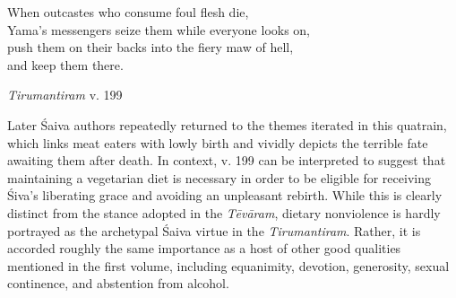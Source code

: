 \begin{pullquote}


	
	    When outcastes who consume foul flesh die,\\
	    Yama's messengers seize them while everyone looks on,\\
	    push them on their backs into the fiery maw of hell,\\
	    and keep them there.\footnotemark{}
	  \\


\medskip\hfill\begin{minipage}{0.9\textwidth}\small\hfill
\emph{{Tirumantiram}} v. 199\end{minipage}\hspace{2em}
\end{pullquote}

Later Śaiva authors repeatedly returned to the themes iterated in this quatrain, which links meat eaters with lowly birth and vividly depicts the terrible fate awaiting them after death. In context, v. 199 can be interpreted to suggest that maintaining a vegetarian diet is necessary in order to be eligible for receiving Śiva’s liberating grace and avoiding an unpleasant rebirth. While this is clearly distinct from the stance adopted in the \emph{{Tēvāram}}, dietary nonviolence is hardly portrayed as the archetypal Śaiva virtue in the \emph{{Tirumantiram}}. Rather, it is accorded roughly the same importance as a host of other good qualities mentioned in the first volume, including equanimity, devotion, generosity, sexual continence, and abstention from alcohol.


